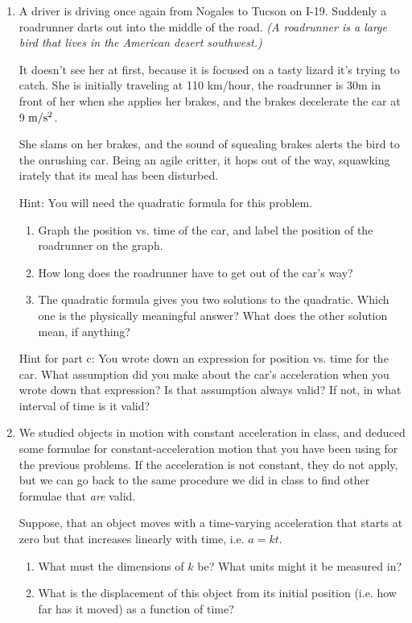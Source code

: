 \documentclass[12pt]{article}
\begin{document}
\begin{enumerate}
\bigskip
\bigskip

\item A driver is driving once again from Nogales to Tucson on I-19. Suddenly a roadrunner darts out into the middle of the road. {\it (A roadrunner is a large bird that lives in the American desert 
    southwest.)}

    It doesn't see her at first, because it is focused on a tasty lizard it's trying to catch. She is initially traveling at 110 km/hour, 
the roadrunner is 30m in front of her when she applies her brakes, and the brakes decelerate the car at 9 $\rm m/\rm s^2$.

She slams on her brakes, and the sound of squealing brakes alerts the bird to the onrushing car. Being an agile critter, it hops out of the way, squawking irately that its meal has been disturbed.

    Hint: You will need the quadratic formula for this problem.
\begin{enumerate}
\item    Graph the position vs. time of the car, and label the position of the roadrunner on the graph.
\item    How long does the roadrunner have to get out of the car's way?
\item    The quadratic formula gives you two solutions to the quadratic. Which one is the physically meaningful answer? What does the other solution mean, if anything?
\end{enumerate}

Hint for part c: You wrote down an expression for position vs. time for the car. What assumption did you make
about the car's acceleration when you wrote down that expression? Is that assumption always valid? If not,
in what interval of time is it valid?

\bigskip
\bigskip

\item We studied objects in motion with constant acceleration in class, and deduced some formulae for 
constant-acceleration motion that you have been using for the previous problems. If the acceleration is not
constant, they do not apply, but we can go back to the same procedure we did in class to find other formulae that
{\it are} valid.

 Suppose, that an object moves with a time-varying acceleration that starts at zero but that increases linearly with time, i.e. $a = kt$. 

\begin{enumerate}
\item What must the dimensions of $k$ be? What units might it be measured in?
\item What is the displacement of this object from its initial position (i.e. how far has it moved) as a function of time?
\end{enumerate}


\end{enumerate}
\end{document}
